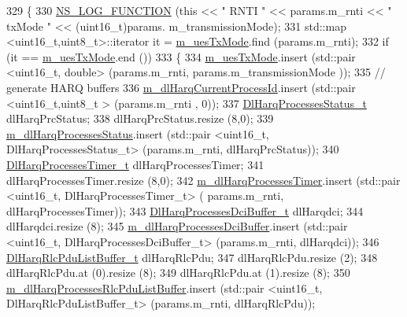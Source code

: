 \begin{DoxyCode}
329 \{
330   \hyperlink{log-macros-disabled_8h_a90b90d5bad1f39cb1b64923ea94c0761}{NS\_LOG\_FUNCTION} (\textcolor{keyword}{this} << \textcolor{stringliteral}{" RNTI "} << params.m\_rnti << \textcolor{stringliteral}{" txMode "} << (uint16\_t)params.
      m\_transmissionMode);
331   std::map <uint16\_t,uint8\_t>::iterator it = \hyperlink{classns3_1_1PfFfMacScheduler_afde3fb192a83a5fafc27ed9a0df82de9}{m\_uesTxMode}.find (params.m\_rnti);
332   \textcolor{keywordflow}{if} (it == \hyperlink{classns3_1_1PfFfMacScheduler_afde3fb192a83a5fafc27ed9a0df82de9}{m\_uesTxMode}.end ())
333     \{
334       \hyperlink{classns3_1_1PfFfMacScheduler_afde3fb192a83a5fafc27ed9a0df82de9}{m\_uesTxMode}.insert (std::pair <uint16\_t, double> (params.m\_rnti, params.m\_transmissionMode
      ));
335       \textcolor{comment}{// generate HARQ buffers}
336       \hyperlink{classns3_1_1PfFfMacScheduler_a792f015651334a9e688d534367f29155}{m\_dlHarqCurrentProcessId}.insert (std::pair <uint16\_t,uint8\_t > (params.m\_rnti
      , 0));
337       \hyperlink{namespacens3_a457b3571b67ff17d042e9894e90e2ce2}{DlHarqProcessesStatus\_t} dlHarqPrcStatus;
338       dlHarqPrcStatus.resize (8,0);
339       \hyperlink{classns3_1_1PfFfMacScheduler_a438c2319e01eaac65f64cbd82b3e8089}{m\_dlHarqProcessesStatus}.insert (std::pair <uint16\_t, DlHarqProcessesStatus\_t> 
      (params.m\_rnti, dlHarqPrcStatus));
340       \hyperlink{namespacens3_a39413ade536de4b1c82d6c0074cc703e}{DlHarqProcessesTimer\_t} dlHarqProcessesTimer;
341       dlHarqProcessesTimer.resize (8,0);
342       \hyperlink{classns3_1_1PfFfMacScheduler_ab115ef9abb936f35aeb5979a8ed8928d}{m\_dlHarqProcessesTimer}.insert (std::pair <uint16\_t, DlHarqProcessesTimer\_t> (
      params.m\_rnti, dlHarqProcessesTimer));
343       \hyperlink{namespacens3_af25599bf8f9f564075c005759c9af18c}{DlHarqProcessesDciBuffer\_t} dlHarqdci;
344       dlHarqdci.resize (8);
345       \hyperlink{classns3_1_1PfFfMacScheduler_af3c0c393dc246b7b6a907539362c935b}{m\_dlHarqProcessesDciBuffer}.insert (std::pair <uint16\_t,
       DlHarqProcessesDciBuffer\_t> (params.m\_rnti, dlHarqdci));
346       \hyperlink{namespacens3_a4c0cbd1e72f1c667f8b5879655f13210}{DlHarqRlcPduListBuffer\_t} dlHarqRlcPdu;
347       dlHarqRlcPdu.resize (2);
348       dlHarqRlcPdu.at (0).resize (8);
349       dlHarqRlcPdu.at (1).resize (8);
350       \hyperlink{classns3_1_1PfFfMacScheduler_acf9952b5bb3d26644b5e25054ca6e385}{m\_dlHarqProcessesRlcPduListBuffer}.insert (std::pair <uint16\_t,
       DlHarqRlcPduListBuffer\_t> (params.m\_rnti, dlHarqRlcPdu));

\end{DoxyCode}
